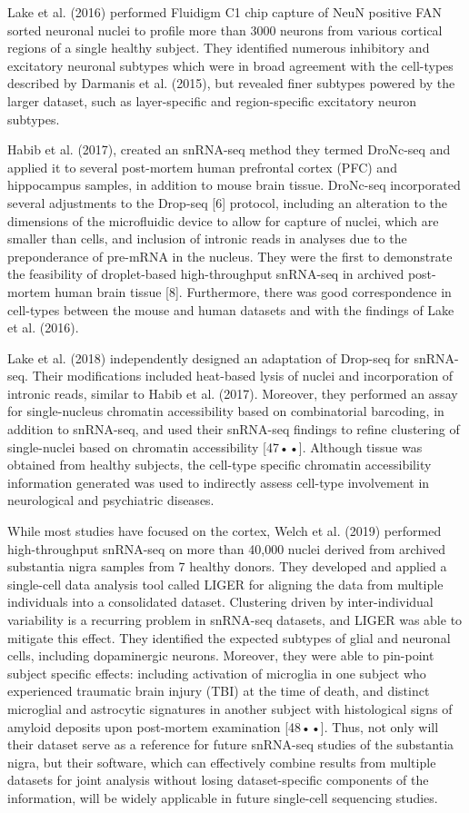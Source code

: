 \documentclass[12pt]{article}
\begin{document}
Lake et al. (2016) performed Fluidigm C1 chip capture of NeuN positive FAN sorted neuronal nuclei to profile more than 3000 neurons from various cortical regions of a single healthy subject.
They identified numerous inhibitory and excitatory neuronal subtypes which were in broad agreement with the cell-types described by Darmanis et al. (2015), but revealed finer subtypes powered by the larger dataset, such as layer-specific and region-specific excitatory neuron subtypes.

Habib et al. (2017), created an snRNA-seq method they termed DroNc-seq and applied it to several post-mortem human prefrontal cortex (PFC) and hippocampus samples, in addition to mouse brain tissue. DroNc-seq incorporated several adjustments to the Drop-seq [6] protocol, including an alteration to the dimensions of the microfluidic device to allow for capture of nuclei, which are smaller than cells, and inclusion of intronic reads in analyses due to the preponderance of pre-mRNA in the nucleus. They were the first to demonstrate the feasibility of droplet-based high-throughput snRNA-seq in archived post-mortem human brain tissue [8]. Furthermore, there was good correspondence in cell-types between the mouse and human datasets and with the findings of Lake et al. (2016).

Lake et al. (2018) independently designed an adaptation of Drop-seq for snRNA-seq. Their modifications included heat-based lysis of nuclei and incorporation of intronic reads, similar to Habib et al. (2017). Moreover, they performed an assay for single-nucleus chromatin accessibility based on combinatorial barcoding, in addition to snRNA-seq, and used their snRNA-seq findings to refine clustering of single-nuclei based on chromatin accessibility [47••]. Although tissue was obtained from healthy subjects, the cell-type specific chromatin accessibility information generated was used to indirectly assess cell-type involvement in neurological and psychiatric diseases.

While most studies have focused on the cortex, Welch et al. (2019) performed high-throughput snRNA-seq on more than 40,000 nuclei derived from archived substantia nigra samples from 7 healthy donors. They developed and applied a single-cell data analysis tool called LIGER for aligning the data from multiple individuals into a consolidated dataset. Clustering driven by inter-individual variability is a recurring problem in snRNA-seq datasets, and LIGER was able to mitigate this effect. They identified the expected subtypes of glial and neuronal cells, including dopaminergic neurons. Moreover, they were able to pin-point subject specific effects: including activation of microglia in one subject who experienced traumatic brain injury (TBI) at the time of death, and distinct microglial and astrocytic signatures in another subject with histological signs of amyloid deposits upon post-mortem examination [48••]. Thus, not only will their dataset serve as a reference for future snRNA-seq studies of the substantia nigra, but their software, which can effectively combine results from multiple datasets for joint analysis without losing dataset-specific components of the information, will be widely applicable in future single-cell sequencing studies.
\end{document}
